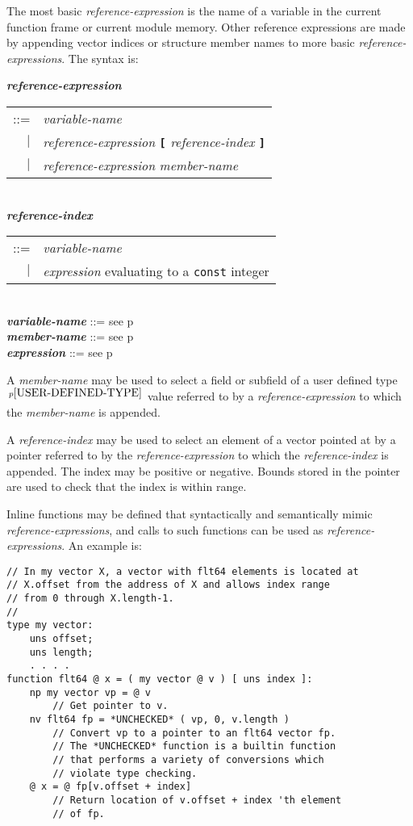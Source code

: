 \documentclass[12pt]{article}
\newcommand{\TT}[1]{{\tt \bfseries #1}}
\newcommand{\emkey}[1]{{\em \bfseries #1}}
\newcommand{\pagref}[1]{p\pageref{#1}}
\newcommand{\pagnote}[1]{$\,^{p\pageref{#1}}$}
\newcommand{\EOL}{\penalty \exhyphenpenalty}
\newenvironment{indpar}[1][0.3in]%
	{\begin{list}{}%
		     {\setlength{\itemsep}{0in}%
		      \setlength{\topsep}{0in}%
		      \setlength{\parsep}{1ex}%
		      \setlength{\labelwidth}{#1}%
		      \setlength{\leftmargin}{#1}%
		      \addtolength{\leftmargin}{\labelsep}}%
	 \item}%
	{\end{list}}
\begin{document}
The most basic {\em reference-expression} is the name of a variable
in the current function frame or current module memory.  Other
reference expressions are made by appending vector indices or structure
member names to more basic {\em reference-expressions}.  The syntax
is:

\begin{indpar}
\emkey{reference-expression}
    \begin{tabular}[t]{rl}
    ::= & {\em variable-name} \\
    $|$ & {\em reference-expression} \TT{[} {\em reference-index} \TT{]} \\
    $|$ & {\em reference-expression} {\em member-name} \\
    \end{tabular}
\\[0.5ex]
\emkey{reference-index}
    \begin{tabular}[t]{rl}
    ::= & {\em variable-name} \\
    $|$ & {\em expression} evaluating to a {\tt const} integer
    \end{tabular}
\\[0.5ex]
\emkey{variable-name} ::= see \pagref{VARIABLE-NAME}
\\[0.5ex]
\emkey{member-name} ::= see \pagref{MEMBER-NAME}
\\[0.5ex]
\emkey{expression} ::= see \pagref{EXPRESSION}
\end{indpar}

A {\em member-name} may be used to select a field or subfield
of a user defined type\pagnote{USER-DEFINED-TYPE} value referred
to by a {\em reference-expression}
to which the {\em member-name} is appended.

A {\em reference-index} may be used to select an element of a vector
pointed at by a pointer referred to by the
{\em reference-expression}
to which the {\em reference-index} is appended.  The index may be
positive or negative.  Bounds stored in the pointer are used to
check that the index is within range.

Inline functions may be defined that syntactically and semantically mimic
{\em reference-\EOL expres\-sions}, and calls to such functions
can be used as {\em reference-expressions}.  An example is:
\label{REFERENCE-EXPRESSION-FUNCTION-EXAMPLE}

\begin{indpar}\begin{verbatim}
// In my vector X, a vector with flt64 elements is located at
// X.offset from the address of X and allows index range
// from 0 through X.length-1.
//
type my vector:
    uns offset;
    uns length;
    . . . .
function flt64 @ x = ( my vector @ v ) [ uns index ]:
    np my vector vp = @ v
        // Get pointer to v.
    nv flt64 fp = *UNCHECKED* ( vp, 0, v.length )
        // Convert vp to a pointer to an flt64 vector fp.
        // The *UNCHECKED* function is a builtin function
        // that performs a variety of conversions which
        // violate type checking.
    @ x = @ fp[v.offset + index]
        // Return location of v.offset + index 'th element
        // of fp.
\end{verbatim}\end{indpar}
\end{document}
